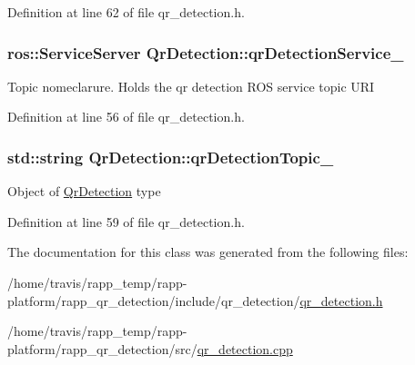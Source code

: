 Definition at line 62 of file qr\-\_\-detection.\-h.

\hypertarget{classQrDetection_a9785dc6824ccc757d5ba8c22d478b271}{
\subsubsection[{qr\-Detection\-Service\-\_\-}]{\setlength{\rightskip}{0pt plus 5cm}ros\-::\-Service\-Server Qr\-Detection\-::qr\-Detection\-Service\-\_\-\hspace{0.3cm}{\ttfamily [private]}}}\label{classQrDetection_a9785dc6824ccc757d5ba8c22d478b271}
Topic nomeclarure. Holds the qr detection R\-O\-S service topic U\-R\-I 

Definition at line 56 of file qr\-\_\-detection.\-h.

\hypertarget{classQrDetection_acbf716f43bb9af5cb95cd0289f07269d}{
\subsubsection[{qr\-Detection\-Topic\-\_\-}]{\setlength{\rightskip}{0pt plus 5cm}std\-::string Qr\-Detection\-::qr\-Detection\-Topic\-\_\-\hspace{0.3cm}{\ttfamily [private]}}}\label{classQrDetection_acbf716f43bb9af5cb95cd0289f07269d}
Object of \hyperlink{classQrDetection}{Qr\-Detection} type 

Definition at line 59 of file qr\-\_\-detection.\-h.



The documentation for this class was generated from the following files\-:\begin{DoxyCompactItemize}
\item 
/home/travis/rapp\-\_\-temp/rapp-\/platform/rapp\-\_\-qr\-\_\-detection/include/qr\-\_\-detection/\hyperlink{qr__detection_8h}{qr\-\_\-detection.\-h}\item 
/home/travis/rapp\-\_\-temp/rapp-\/platform/rapp\-\_\-qr\-\_\-detection/src/\hyperlink{qr__detection_8cpp}{qr\-\_\-detection.\-cpp}\end{DoxyCompactItemize}
